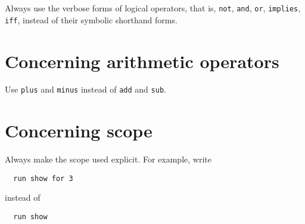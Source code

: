 \documentclass{article}
\begin{document}
Always use the verbose forms of logical operators, that is, \lstinline|not|, \lstinline|and|, \lstinline|or|, \lstinline|implies|, \lstinline|iff|, instead of their symbolic shorthand forms.

\section*{Concerning arithmetic operators}

Use \lstinline|plus| and \lstinline|minus| instead of \lstinline|add| and \lstinline|sub|.

\section*{Concerning scope}

Always make the scope used explicit.
For example, write
\begin{lstlisting}
  run show for 3
\end{lstlisting}
instead of
\begin{lstlisting}
  run show
\end{lstlisting}
\end{document}
